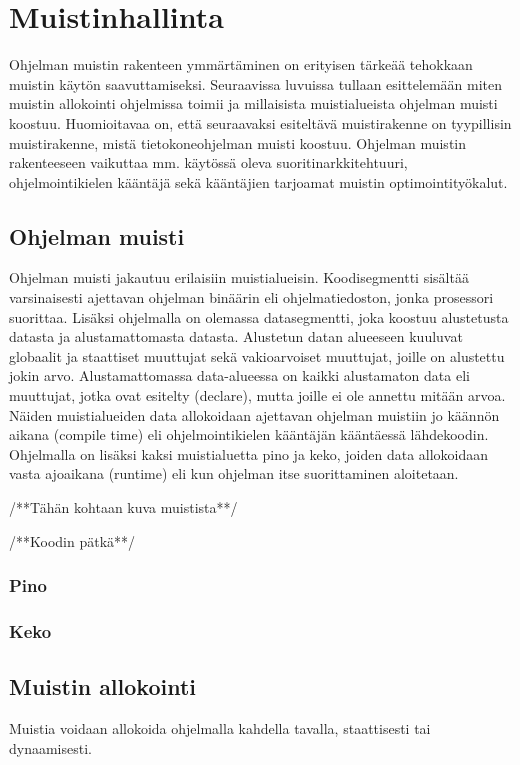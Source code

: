 \chapter{Muistinhallinta} \label{Toinen luku}

Ohjelman muistin rakenteen ymmärtäminen on erityisen tärkeää tehokkaan muistin käytön saavuttamiseksi. Seuraavissa luvuissa tullaan esittelemään miten muistin allokointi ohjelmissa toimii
ja millaisista muistialueista ohjelman muisti koostuu. Huomioitavaa on, että seuraavaksi esiteltävä muistirakenne on tyypillisin muistirakenne, mistä tietokoneohjelman muisti koostuu. Ohjelman muistin rakenteeseen vaikuttaa mm. käytössä oleva suoritinarkkitehtuuri, ohjelmointikielen kääntäjä sekä kääntäjien tarjoamat muistin optimointityökalut.

\section{Ohjelman muisti}

Ohjelman muisti jakautuu erilaisiin muistialueisin. Koodisegmentti sisältää varsinaisesti ajettavan ohjelman binäärin eli ohjelmatiedoston, jonka prosessori suorittaa. Lisäksi ohjelmalla on olemassa datasegmentti, joka koostuu alustetusta datasta ja alustamattomasta datasta. Alustetun datan alueeseen kuuluvat globaalit ja staattiset muuttujat sekä vakioarvoiset muuttujat, joille on alustettu jokin arvo. Alustamattomassa data-alueessa on kaikki alustamaton data eli muuttujat, jotka ovat esitelty (declare), mutta joille ei ole annettu mitään arvoa.\cite{mmic2010} Näiden muistialueiden data allokoidaan ajettavan ohjelman muistiin jo käännön aikana (compile time) eli ohjelmointikielen kääntäjän kääntäessä lähdekoodin. Ohjelmalla on lisäksi kaksi muistialuetta pino ja keko, joiden data allokoidaan vasta ajoaikana (runtime) eli kun ohjelman itse suorittaminen aloitetaan.

/**Tähän kohtaan kuva muistista**/

/**Koodin pätkä**/

\subsection{Pino}
\subsection{Keko}

\section{Muistin allokointi}

Muistia voidaan allokoida ohjelmalla kahdella tavalla, staattisesti tai dynaamisesti.